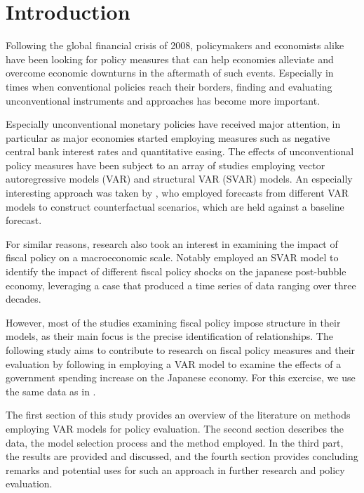 \section{Introduction}

Following the global financial crisis of 2008, policymakers and economists alike have been looking for policy measures that can help economies alleviate and overcome economic downturns in the aftermath of such events. Especially in times when conventional policies reach their borders, finding and evaluating unconventional instruments and approaches has become more important.

Especially unconventional monetary policies have received major attention, in particular as major economies started employing measures such as negative central bank interest rates and quantitative easing. The effects of unconventional policy measures have been subject to an array of studies employing vector autoregressive models (VAR) and structural VAR (SVAR) models. An especially interesting approach was taken by \citet{kapetanios2012}, who employed forecasts from different VAR models to construct counterfactual scenarios, which are held against a baseline forecast.

For similar reasons, research also took an interest in examining the impact of fiscal policy on a macroeconomic scale. Notably \citet{morita2017} employed an SVAR model to identify the impact of different fiscal policy shocks on the japanese post-bubble economy, leveraging a case that produced a time series of data ranging over three decades. 

However, most of the studies examining fiscal policy impose structure in their models, as their main focus is the precise identification of relationships. The following study aims to contribute to research on fiscal policy measures and their evaluation by following \citeauthor{kapetanios2012} in employing a VAR model to examine the effects of a government spending increase on the Japanese economy. For this exercise, we use the same data as in \citealt{morita2017}.

The first section of this study provides an overview of the literature on methods employing VAR models for policy evaluation. The second section describes the data, the model selection process and the method employed. In the third part, the results are provided and discussed, and the fourth section provides concluding remarks and potential uses for such an approach in further research and policy evaluation.